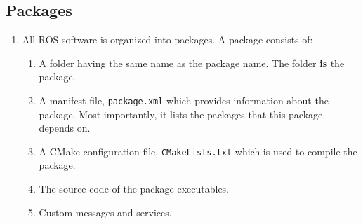 \documentclass{article}
\begin{document}
        \subsection{Packages}
            \begin{enumerate}
                \item All ROS software is organized into packages. A package consists of:
                \begin{enumerate}
                    \item A folder having the same name as the package name. The folder \textbf{is} the package.
                    \item A manifest file, \texttt{package.xml} which provides information about the package. Most importantly, it lists the packages
                    that this package depends on.
                    \item A CMake configuration file, \texttt{CMakeLists.txt} which is used to compile the package.
                    \item The source code of the package executables.
                    \item Custom messages and services. 
                \end{enumerate}


\end{enumerate}
\end{document}
